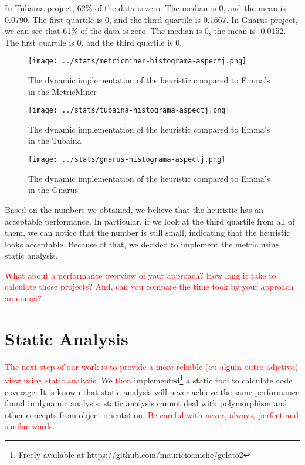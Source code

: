 \documentclass{sig-alternate}
\begin{document}
In Tubaina project, 62\% of the data is zero. The median is 0, and the mean is 0.0790. The first quartile is
0, and the third quartile is 0.1667. 
In Gnarus project, we can see that 61\% of the data is zero. The median is 0, the mean is -0.0152. The first quartile
is 0, and the third quartile is 0.

\begin{figure}[h!H]
  \centering
  \texttt{[image: ../stats/metricminer-histograma-aspectj.png]}
  \caption{The dynamic implementation of the heuristic compared to Emma's in the MetricMiner}
  \label{fig:metricminer-aj}
\end{figure}

\begin{figure}[h!H]
  \centering
  \texttt{[image: ../stats/tubaina-histograma-aspectj.png]}
  \caption{The dynamic implementation of the heuristic compared to Emma's in the Tubaina}
  \label{fig:tubaina-aj}
\end{figure}

\begin{figure}[h!H]
  \centering
  \texttt{[image: ../stats/gnarus-histograma-aspectj.png]}
  \caption{The dynamic implementation of the heuristic compared to Emma's in the Gnarus}
  \label{fig:gnarus-aj}
\end{figure}

Based on the numbers we obtained, we believe that the heuristic has an acceptable performance. 
In particular, if we look at the third quartile from all of them, we can notice that the number is
still small, indicating that the heuristic looks acceptable. Because of that,
we decided to implement the metric using static analysis. 

\textcolor{red}{What about a performance overview of your approach? How long it take to calculate those projects? And, can you compare the time took by your approach an emma?}

\section{Static Analysis}
\label{sec-results}

\textcolor{red}{The next step of our work is to provide a more reliable (ou algum outro adjetivo) view using static analyzis.} 
 We \textcolor{red}{then} implemented\footnote{Freely available at https://github.com/mauricioaniche/gelato2} a static tool
to calculate code coverage. It is known that static analysis will never achieve the same performance
found in dynamic analysis: static analysis cannot deal with polymorphism and other concepts from object-orientation. \textcolor{red}{Be careful with never, always, perfect and similar words.}
\end{document}
